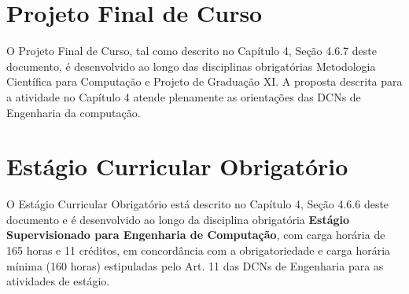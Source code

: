 \section{Projeto Final de Curso}
O Projeto Final de Curso, tal como descrito no Capítulo 4, Seção 4.6.7 deste documento, é 
desenvolvido ao longo das disciplinas obrigatórias Metodologia Científica para Computação e Projeto de Graduação XI. A proposta descrita para a atividade no Capítulo 4 atende plenamente as orientações das DCNs de Engenharia da computação. 

\section{Estágio Curricular Obrigatório}
O Estágio Curricular Obrigatório está descrito no Capítulo 4, Seção 4.6.6 deste documento e é desenvolvido ao longo da disciplina obrigatória \textbf{Estágio Supervisionado para Engenharia de Computação}, com carga horária de 165 horas e 11 créditos, 
em concordância com a obrigatoriedade e carga horária mínima (160 horas) estipuladas pelo Art. 11 das DCNs de Engenharia para as atividades de estágio.
